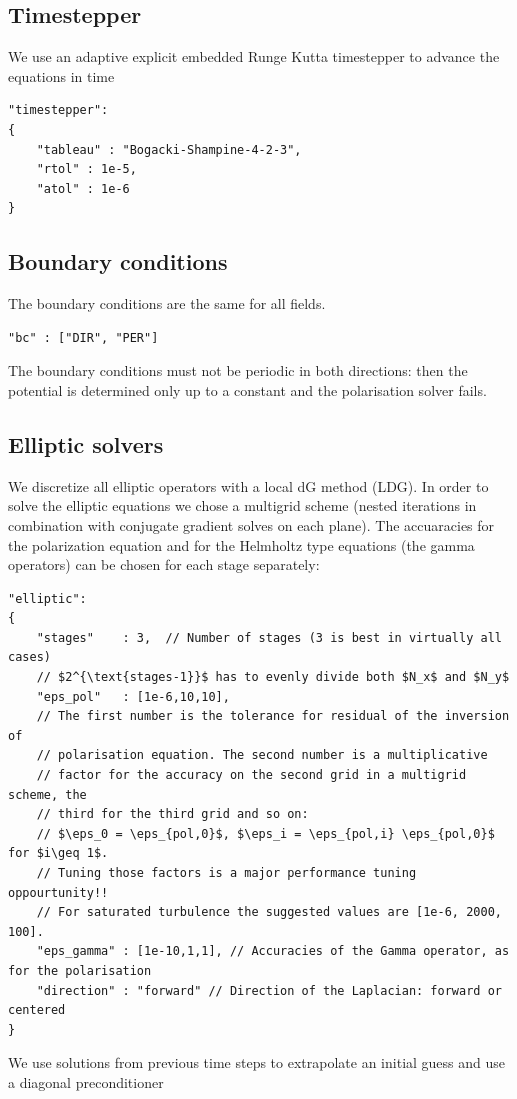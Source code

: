 \subsection{Timestepper}
We use an adaptive explicit embedded Runge Kutta timestepper to advance the equations in time
\begin{verbatim}
"timestepper":
{
    "tableau" : "Bogacki-Shampine-4-2-3",
    "rtol" : 1e-5,
    "atol" : 1e-6
}
\end{verbatim}
\subsection{Boundary conditions}
The boundary conditions are the same for all fields.
\begin{verbatim}
"bc" : ["DIR", "PER"]
\end{verbatim}
The boundary conditions must not be periodic in both directions: then the
potential is determined only up to a constant and the polarisation solver
fails.

\subsection{Elliptic solvers}
We discretize all elliptic operators with a local dG method (LDG).  In order to
solve the elliptic equations we chose a multigrid scheme (nested iterations in
combination with conjugate gradient solves on each plane). The accuaracies for
the polarization equation and for the Helmholtz type equations (the gamma
operators) can be chosen for each stage separately:
\begin{verbatim}
"elliptic":
{
    "stages"    : 3,  // Number of stages (3 is best in virtually all cases)
    // $2^{\text{stages-1}}$ has to evenly divide both $N_x$ and $N_y$
    "eps_pol"   : [1e-6,10,10],
    // The first number is the tolerance for residual of the inversion of
    // polarisation equation. The second number is a multiplicative
    // factor for the accuracy on the second grid in a multigrid scheme, the
    // third for the third grid and so on:
    // $\eps_0 = \eps_{pol,0}$, $\eps_i = \eps_{pol,i} \eps_{pol,0}$  for $i\geq 1$.
    // Tuning those factors is a major performance tuning oppourtunity!!
    // For saturated turbulence the suggested values are [1e-6, 2000, 100].
    "eps_gamma" : [1e-10,1,1], // Accuracies of the Gamma operator, as for the polarisation
    "direction" : "forward" // Direction of the Laplacian: forward or centered
}
\end{verbatim}
\begin{tcolorbox}[title=Note]
    We use solutions from previous time steps to extrapolate an initial guess
    and use a diagonal preconditioner
\end{tcolorbox}
